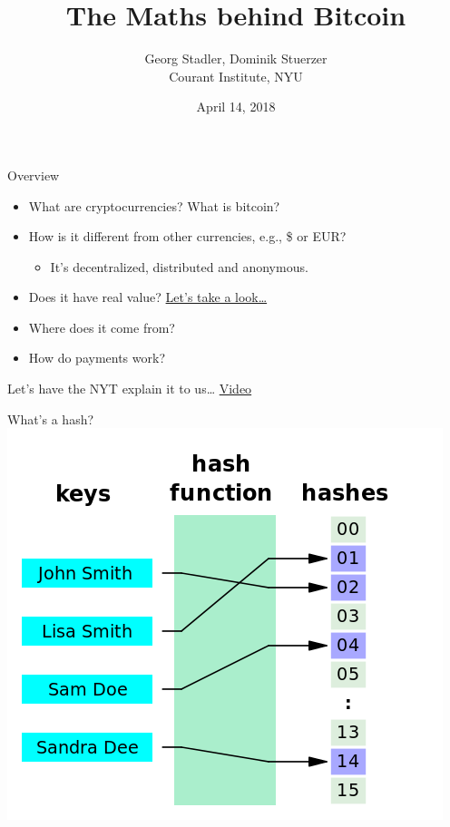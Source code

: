 \documentclass[12pt]{beamer}
\title{{\bf The Maths behind Bitcoin }}
\date{April 14, 2018}
\author{Georg Stadler, Dominik Stuerzer \\ Courant Institute, NYU}
\theoremstyle{definition}
\numberwithin{equation}{section}
\begin{document}
\begin{frame}
\maketitle
\end{frame}


\begin{frame}{Overview}
  \begin{itemize}
  \item What are cryptocurrencies? What is bitcoin?\\[3ex]
    \pause
  \item How is it different from other currencies, e.g., \$ or EUR? \\[1ex]
    \pause
    \begin{itemize}
      \item It's decentralized, distributed and anonymous.\\[1ex]
    \end{itemize}
    \pause
  \item Does it have real value?
    \href{https://www.coindesk.com/price/}{Let's take a look\ldots}\\[3ex]
    \pause
  \item Where does it come from?\\[3ex]
    \pause
  \item How do payments work?
  \end{itemize}
\end{frame}


\begin{frame}{Let's have the NYT explain it to us\ldots}
\centering
  \href{https://www.nytimes.com/video/business/100000005675385/baffled-by-bitcoin-heres-how-cryptocurrency-works.html?smid=pl-share}{\Large
    Video}\\[3ex]  
\end{frame}

\begin{frame}{What's a hash?}
\includegraphics[width=.5\columnwidth]{hash_wikipedia}
\end{frame}
\end{document}
